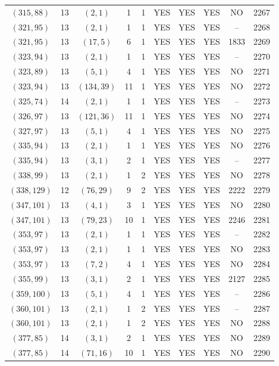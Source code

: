 \begin{longtable}{|c|c|c|c|c|c|c|c|c|c|}
$(315, 88)$ & 13 & $(2, 1)$ & 1 & 1 & YES & YES & YES & NO & 2267\\
$(321, 95)$ & 13 & $(2, 1)$ & 1 & 1 & YES & YES & YES & -- & 2268\\
$(321, 95)$ & 13 & $(17, 5)$ & 6 & 1 & YES & YES & YES & 1833 & 2269\\
$(323, 94)$ & 13 & $(2, 1)$ & 1 & 1 & YES & YES & YES & -- & 2270\\
$(323, 89)$ & 13 & $(5, 1)$ & 4 & 1 & YES & YES & YES & NO & 2271\\
$(323, 94)$ & 13 & $(134, 39)$ & 11 & 1 & YES & YES & YES & NO & 2272\\
$(325, 74)$ & 14 & $(2, 1)$ & 1 & 1 & YES & YES & YES & -- & 2273\\
$(326, 97)$ & 13 & $(121, 36)$ & 11 & 1 & YES & YES & YES & NO & 2274\\
$(327, 97)$ & 13 & $(5, 1)$ & 4 & 1 & YES & YES & YES & NO & 2275\\
$(335, 94)$ & 13 & $(2, 1)$ & 1 & 1 & YES & YES & YES & NO & 2276\\
$(335, 94)$ & 13 & $(3, 1)$ & 2 & 1 & YES & YES & YES & -- & 2277\\
$(338, 99)$ & 13 & $(2, 1)$ & 1 & 2 & YES & YES & YES & NO & 2278\\
$(338, 129)$ & 12 & $(76, 29)$ & 9 & 2 & YES & YES & YES & 2222 & 2279\\
$(347, 101)$ & 13 & $(4, 1)$ & 3 & 1 & YES & YES & YES & NO & 2280\\
$(347, 101)$ & 13 & $(79, 23)$ & 10 & 1 & YES & YES & YES & 2246 & 2281\\
$(353, 97)$ & 13 & $(2, 1)$ & 1 & 1 & YES & YES & YES & -- & 2282\\
$(353, 97)$ & 13 & $(2, 1)$ & 1 & 1 & YES & YES & YES & NO & 2283\\
$(353, 97)$ & 13 & $(7, 2)$ & 4 & 1 & YES & YES & YES & NO & 2284\\
$(355, 99)$ & 13 & $(3, 1)$ & 2 & 1 & YES & YES & YES & 2127 & 2285\\
$(359, 100)$ & 13 & $(5, 1)$ & 4 & 1 & YES & YES & YES & -- & 2286\\
$(360, 101)$ & 13 & $(2, 1)$ & 1 & 2 & YES & YES & YES & -- & 2287\\
$(360, 101)$ & 13 & $(2, 1)$ & 1 & 2 & YES & YES & YES & NO & 2288\\
$(377, 85)$ & 14 & $(3, 1)$ & 2 & 1 & YES & YES & YES & NO & 2289\\
$(377, 85)$ & 14 & $(71, 16)$ & 10 & 1 & YES & YES & YES & NO & 2290\\

\end{longtable}
